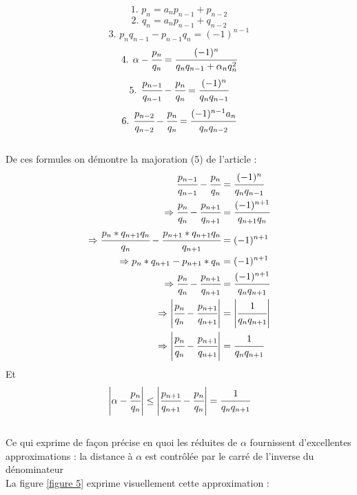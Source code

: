 \documentclass[moyen]{classeUPD}
\begin{document}
$$\text{1. }p_{n}=a_{n}p_{n-1}+p_{n-2}$$
$$\text{2. }q_{n}=a_{n}p_{n-1}+q_{n-2}$$
$$\text{3. } p_{n}q_{n-1}-p_{n-1}q_{n}=(-1)^{n-1}$$
$$\text{4. }\alpha - \cfrac{p_{n}}{q_{n}} = \cfrac{(-1)^{n}}{q_{n}q_{n-1}+\alpha_{n}q_{n}^{2}}$$
$$\text{5. }\cfrac{p_{n-1}}{q_{n-1}}-\cfrac{p_{n}}{q_{n}}= \cfrac{(-1)^{n}}{q_{n}q_{n-1}}$$
$$\text{6. }\cfrac{p_{n-2}}{q_{n-2}}-\cfrac{p_{n}}{q_{n}}= \cfrac{(-1)^{n-1}a_{n}}{q_{n}q_{n-2}}$$\\

De ces formules on démontre la majoration (5) de l’article \cite{caruso_application_nodate} :\\

\begin{align*}
	\cfrac{p_{n-1}}{q_{n-1}}-\cfrac{p_{n}}{q_{n}}&= \cfrac{(-1)^{n}}{q_{n}q_{n-1}}\\
	\Rightarrow\cfrac{p_{n}}{q_{n}}-\cfrac{p_{n+1}}{q_{n+1}}&= \cfrac{(-1)^{n+1}}{q_{n+1}q_{n}}\\
	\Rightarrow\cfrac{p_{n}*q_{n+1}q_{n}}{q_{n}}-\cfrac{p_{n+1}*q_{n+1}q_{n}}{q_{n+1}}&= (-1)^{n+1}\\
	\Rightarrow p_{n}*q_{n+1}-p_{n+1}*q_{n}&= (-1)^{n+1}\\
	\Rightarrow\cfrac{p_{n}}{q_{n}}-\cfrac{p_{n+1}}{q_{n+1}}&=\cfrac{(-1)^{n+1}}{q_{n}q_{n+1}}\\
	\Rightarrow\left|\cfrac{p_{n}}{q_{n}}-\cfrac{p_{n+1}}{q_{n+1}}\right|&=\left|\cfrac{1}{q_{n}q_{n+1}}\right|\\
	\Rightarrow\left|\cfrac{p_{n}}{q_{n}}-\cfrac{p_{n+1}}{q_{n+1}}\right|&=\cfrac{1}{q_{n}q_{n+1}}
\end{align*}
Et
$$\left|\alpha-\cfrac{p_{n}}{q_{n}}\right| \le \left|\cfrac{p_{n+1}}{q_{n+1}}-\cfrac{p_{n}}{q_{n}}\right|=\cfrac{1}{q_{n}q_{n+1}}$$\\

Ce qui exprime de façon précise en quoi les réduites de $\alpha$ fournissent d'excellentes approximations : la distance à $\alpha$ est contrôlée par le carré de l'inverse du dénominateur\\

La figure \ref{figure 5} exprime visuellement cette approximation :\\
\end{document}
